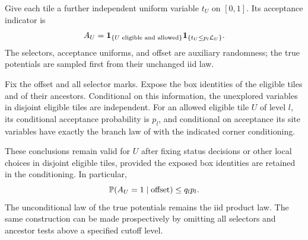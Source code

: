 Give each tile a further independent uniform variable $t_U$ on $[0,1]$.
Its acceptance indicator is
\begin{equation}
 A_U=\mathbf 1_{\{U\text{ eligible and allowed}\}}
             \mathbf 1_{\{t_U\le p_l\mathcal L_U\}}.
 \label{hier:acceptance}
\end{equation}
The selectors, acceptance uniforms, and offset are auxiliary randomness;
the true potentials are sampled first from their unchanged iid law.

\begin{proposition}
\label{hier:sampling}
Fix the offset and all selector marks.  Expose the box identities of the
eligible tiles and of their ancestors.  Conditional on this information,
the unexplored variables in disjoint eligible tiles are independent.
For an allowed eligible tile $U$ of level $l$, its conditional acceptance
probability is $p_l$, and conditional on acceptance its site variables
have exactly the branch law of  with the indicated
corner conditioning.

These conclusions remain valid for $U$ after fixing status decisions or
other local choices in disjoint eligible tiles, provided the exposed box
identities are retained in the conditioning.  In particular,
\begin{equation}
 \mathbb P(A_U=1\mid\text{offset})\le q_l p_l.
 \label{hier:incidence}
\end{equation}
The unconditional law of the true potentials remains the iid product
law.  The same construction can be made prospectively by omitting all
selectors and ancestor tests above a specified cutoff level.
\end{proposition}

